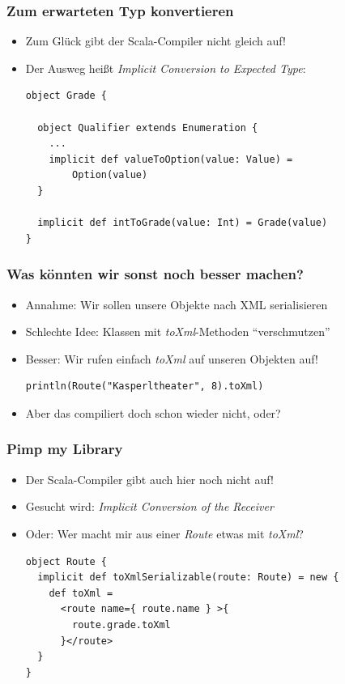 \documentclass{beamer}
\begin{document}
\begin{frame}[fragile]
  \frametitle{Zum erwarteten Typ konvertieren}
  \begin{itemize}
    \item Zum Gl\"uck gibt der Scala-Compiler nicht gleich auf!
    \item Der Ausweg hei{\ss}t \emph{Implicit Conversion to Expected Type}:
    \begin{lstlisting}
object Grade {

  object Qualifier extends Enumeration {
    ...
    implicit def valueToOption(value: Value) =
        Option(value)
  }

  implicit def intToGrade(value: Int) = Grade(value)
}
    \end{lstlisting}
  \end{itemize}
\end{frame}

\begin{frame}[fragile]
  \frametitle{Was k\"onnten wir sonst noch besser machen?}
  \begin{itemize}
    \item Annahme: Wir sollen unsere Objekte nach XML serialisieren
    \item Schlechte Idee: Klassen mit \emph{toXml}-Methoden "`verschmutzen"'
    \item Besser: Wir rufen einfach \emph{toXml} auf unseren Objekten auf!
    \begin{lstlisting}
println(Route("Kasperltheater", 8).toXml)
    \end{lstlisting}
    \item Aber das compiliert doch schon wieder nicht, oder?
  \end{itemize}
\end{frame}

\begin{frame}[fragile]
  \frametitle{Pimp my Library}
  \begin{itemize}
    \item Der Scala-Compiler gibt auch hier noch nicht auf!
    \item Gesucht wird: \emph{Implicit Conversion of the Receiver}
    \item Oder: Wer macht mir aus einer \emph{Route} etwas mit \emph{toXml}?
    \begin{lstlisting}
object Route {
  implicit def toXmlSerializable(route: Route) = new {
    def toXml =
      <route name={ route.name } >{ 
        route.grade.toXml
      }</route>
  }
}
    \end{lstlisting}
  \end{itemize}
\end{frame}
\end{document}
